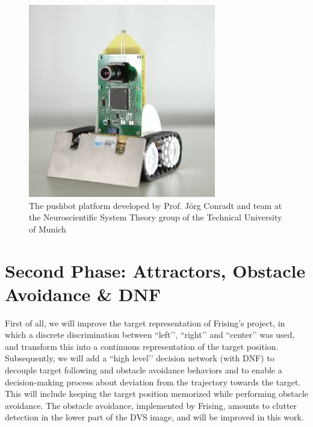 \documentclass[a4paper, twocolumn]{article}
\begin{document}
\begin{figure}
    \centering
    \includegraphics[width=1.0\linewidth]{pushbot1croppedcropped.jpg}
    \caption{The pushbot platform developed by Prof. Jörg Conradt and team at the Neuroscientific System Theory group of the Technical University of Munich}
    \label{fig:pushbot}
\end{figure}

\section*{Second Phase: Attractors, Obstacle Avoidance \& DNF}
First of all, we will improve the target representation of Frising’s project, in which a discrete discrimination between ``left’’, ``right’’ and ``center’’ was used, and transform this into a continuous representation of the target position. Subsequently, we will add a ``high level’’ decision network (with DNF) to decouple target following and obstacle avoidance behaviors and to enable a decision-making process about deviation from the trajectory towards the target. This will include keeping the target position memorized while performing obstacle avoidance.
The obstacle avoidance, implemented by Frising, amounts to clutter detection in the lower part of the DVS image, and will be improved in this work.
\end{document}
